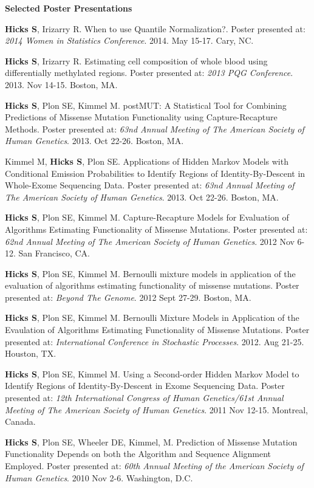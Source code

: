 \documentclass[10pt]{article}
\begin{document}
\textbf{Selected Poster Presentations} 
\begin{enumerate}[label= {[\arabic*]}]
\item {\bf Hicks S}, Irizarry R. When to use Quantile Normalization?. Poster presented at: \emph{2014 Women in Statistics Conference}. 2014. May 15-17. Cary, NC.
\item {\bf Hicks S}, Irizarry R. Estimating cell composition of whole blood using differentially methylated regions. Poster presented at: \emph{2013 PQG Conference}. 2013. Nov 14-15. Boston, MA. 
\item {\bf Hicks S}, Plon SE, Kimmel M. postMUT: A Statistical Tool for Combining Predictions of Missense Mutation Functionality using Capture-Recapture Methods. Poster presented at: \emph{63nd Annual Meeting of The American Society of Human Genetics}. 2013. Oct 22-26. Boston, MA.
\item Kimmel M, {\bf Hicks S}, Plon SE. Applications of Hidden Markov Models with Conditional Emission Probabilities to Identify Regions of Identity-By-Descent in Whole-Exome Sequencing Data. Poster presented at: \emph{63nd Annual Meeting of The American Society of Human Genetics}. 2013. Oct 22-26. Boston, MA.
\item {\bf Hicks S}, Plon SE, Kimmel M. Capture-Recapture Models for Evaluation of Algorithms Estimating Functionality of Missense Mutations. Poster presented at: \emph{62nd Annual Meeting of The American Society of Human Genetics}. 2012 Nov 6-12. San Francisco, CA. %
\item {\bf Hicks S}, Plon SE, Kimmel M. Bernoulli mixture models in application of the evaluation of algorithms estimating functionality of missense mutations. Poster presented at: \emph{Beyond The Genome}. 2012 Sept 27-29. Boston, MA.
\item {\bf Hicks S}, Plon SE, Kimmel M. Bernoulli Mixture Models in Application of the Evaulation of Algorithms Estimating Functionality of Missense Mutations. Poster presented at: \emph{International Conference in Stochastic Processes}. 2012. Aug 21-25. Houston, TX. 
\item {\bf Hicks S}, Plon SE, Kimmel M. Using a Second-order Hidden Markov Model to Identify Regions of Identity-By-Descent in Exome Sequencing Data. Poster presented at: \emph{12th International Congress of Human Genetics/61st Annual Meeting of The American Society of Human Genetics}. 2011 Nov 12-15. Montreal, Canada.
\item {\bf Hicks S}, Plon SE, Wheeler DE, Kimmel, M. Prediction of Missense Mutation Functionality Depends on both the Algorithm and Sequence Alignment Employed. Poster presented at: \emph{60th Annual Meeting of the American Society of Human Genetics}. 2010 Nov 2-6. Washington, D.C.

\end{enumerate}
\end{document}
